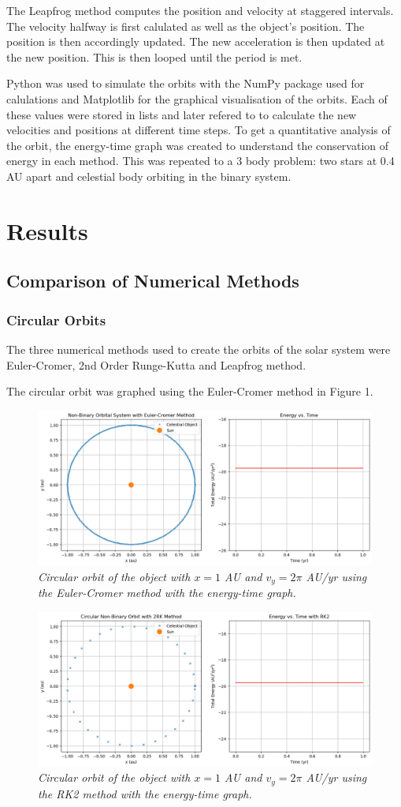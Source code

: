 \documentclass[12 pt, a4paper]{article}
\begin{document}
The Leapfrog method computes the position and velocity at staggered intervals. The velocity halfway is first calulated as well as the object's position. The position is then accordingly updated. The new acceleration
is then updated at the new position. This is then looped until the period is met.

Python was used to simulate the orbits with the NumPy package used for calulations and Matplotlib for the graphical visualisation of the orbits. Each of these values were stored in lists and later refered to to calculate
the new velocities and positions at different time steps. To get a quantitative analysis of the orbit, the energy-time graph was created to understand the conservation of energy in each method. This was repeated
to a 3 body problem: two stars at 0.4 AU apart and celestial body orbiting in the binary system.

\section{Results}
\subsection{Comparison of Numerical Methods}
\subsubsection{Circular Orbits}
The three numerical methods used to create the orbits of the solar system were Euler-Cromer, 2nd Order Runge-Kutta and Leapfrog method.

The circular orbit was graphed using the Euler-Cromer method in Figure 1.
\begin{figure}[H]
  \includegraphics[width=0.7\linewidth]{eulercromercircular.png}
  \centering
  \caption{\textit{Circular orbit of the object with $x = 1$ AU and $v_y = 2\pi$ AU/yr using the Euler-Cromer method with the energy-time graph.}} 
\end{figure}

\begin{figure}[H]
  \includegraphics[width=0.7\linewidth]{rk2circular.png}
  \centering
  \caption{\textit{Circular orbit of the object with $x = 1$ AU and $v_y = 2\pi$ AU/yr using the RK2 method with the energy-time graph.}}
\end{figure}
\end{document}
